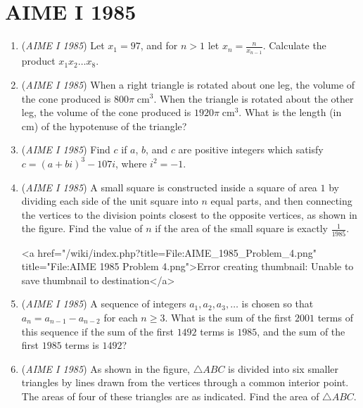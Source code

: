 \section{AIME I 1985}
        \begin{enumerate}
        	\item (\textit{AIME I 1985}) Let $x_1=97$, and for $n>1$ let $x_n=\frac{n}{x_{n-1}}$. Calculate the product $x_1x_2 \ldots x_8$.


 

	\item (\textit{AIME I 1985}) When a right triangle is rotated about one leg, the volume of the cone produced is $800\pi \;\textrm{cm}^3$. When the triangle is rotated about the other leg, the volume of the cone produced is $1920\pi \;\textrm{cm}^3$. What is the length (in cm) of the hypotenuse of the triangle?


 

	\item (\textit{AIME I 1985}) Find $c$ if $a$, $b$, and $c$ are positive integers which satisfy $c=(a + bi)^3 - 107i$, where $i^2 = -1$.


 

	\item (\textit{AIME I 1985}) A small  square is constructed inside a square of area $1$ by dividing each side of the unit square into $n$ equal parts, and then connecting the  vertices to the division points closest to the opposite vertices, as shown in the figure. Find the value of $n$ if the area of the small square is exactly $\frac1{1985}$.


 <a href="/wiki/index.php?title=File:AIME\_1985\_Problem\_4.png" title="File:AIME 1985 Problem 4.png">Error creating thumbnail: Unable to save thumbnail to destination</a>


	\item (\textit{AIME I 1985}) A sequence of integers $a_1, a_2, a_3, \ldots$ is chosen so that $a_n = a_{n - 1} - a_{n - 2}$ for each $n \ge 3$. What is the sum of the first $2001$ terms of this sequence if the sum of the first $1492$ terms is $1985$, and the sum of the first $1985$ terms is $1492$?


 

	\item (\textit{AIME I 1985}) As shown in the figure, $\triangle ABC$ is divided into six smaller triangles by lines drawn from the vertices through a common interior point. The areas of four of these triangles are as indicated. Find the area of $\triangle ABC$.



\end{enumerate}
